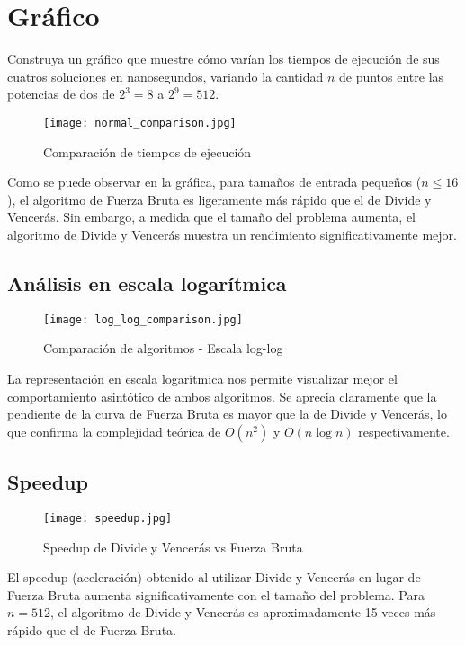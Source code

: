 \documentclass{article}
\begin{document}
\section{Gráfico} Construya un gráfico que muestre cómo varían los tiempos de ejecución de sus cuatros soluciones en nanosegundos, variando la cantidad $n$ de puntos entre las potencias de dos de $2^3=8$ a $2^9=512$.

\begin{figure}[H]
\centering
\texttt{[image: normal\_comparison.jpg]}
\caption{Comparación de tiempos de ejecución}
\end{figure}

Como se puede observar en la gráfica, para tamaños de entrada pequeños ($n \leq 16$), el algoritmo de Fuerza Bruta es ligeramente más rápido que el de Divide y Vencerás. Sin embargo, a medida que el tamaño del problema aumenta, el algoritmo de Divide y Vencerás muestra un rendimiento significativamente mejor.

\subsection{Análisis en escala logarítmica}

\begin{figure}[H]
\centering
\texttt{[image: log\_log\_comparison.jpg]}
\caption{Comparación de algoritmos - Escala log-log}
\end{figure}

La representación en escala logarítmica nos permite visualizar mejor el comportamiento asintótico de ambos algoritmos. Se aprecia claramente que la pendiente de la curva de Fuerza Bruta es mayor que la de Divide y Vencerás, lo que confirma la complejidad teórica de $O(n^2)$ y $O(n \log n)$ respectivamente.

\subsection{Speedup}

\begin{figure}[H]
\centering
\texttt{[image: speedup.jpg]}
\caption{Speedup de Divide y Vencerás vs Fuerza Bruta}
\end{figure}

El speedup (aceleración) obtenido al utilizar Divide y Vencerás en lugar de Fuerza Bruta aumenta significativamente con el tamaño del problema. Para $n = 512$, el algoritmo de Divide y Vencerás es aproximadamente 15 veces más rápido que el de Fuerza Bruta.
\end{document}
